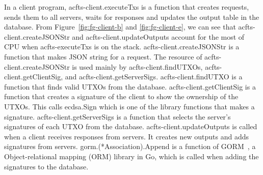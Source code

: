 \documentclass[a4paper, oneside]{discothesis}
\begin{document}
In a client program, acfts-client.executeTxs is a function that creates requests,
sends them to all servers, waits for responses and updates the output table in the database.
From Figure~\ref{fig:fg-client-b} and \ref{fig:fg-client-e}, we can see
that acfts-client.createJSONStr and acfts-client.updateOutputs account for
the most of CPU when acfts-executeTxs is on the stack.
acfts-client.createJSONStr is a function that makes JSON string for a request.
The resource of acfts-client.createJSONStr is used mainly by acfts-client.findUTXOs,
acfts-client.getClientSig, and acfts-client.getServerSigs.
acfts-client.findUTXO is a function that finds valid UTXOs from the database.
acfts-client.getClientSig is a function that creates a signature of the client
to show the ownership of the UTXOs.
This calls ecdsa.Sign which is one of the library functions that makes a signature.
acfts-client.getServerSigs is a function that selects the server's signatures
of each UTXO from the database.
acfts-client.updateOutputs is called when a client receives responses from servers.
It creates new outputs and adds signatures from servers.
gorm.(*Association).Append is a function of GORM~\cite{gorm},
a Object-relational mapping (ORM) library in Go,
which is called when adding the signatures to the database.
\end{document}
